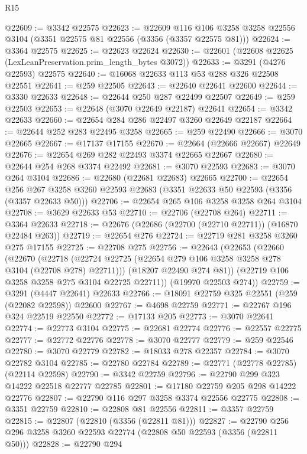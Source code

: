 \begin{lexlean}{R15}
\begin{coremodule}
@22609 := @3342 @22575
@22623 := @22609
    @116
    @106
    @3258
    @3258
    @22556
    @3104
    (@3351 @22575 @81 @22556 (@3356 (@3357 @22575 @81)))
@22624 := @3364 @22575
@22625 := @22623 @22624
@22630 := @22601 (@22608 @22625 (LexLeanPreservation.prim_length_bytes @3072))
@22633 := @3291 (@4276 @22593) @22575
@22640 := @16068 @22633 @113 @53 @288 @326 @22508 @22551
@22641 := @259 @22505
@22643 := @22640 @22641 @22600
@22644 := @3330 @22633
@22648 := @22644 @250 @287 @22499 @22507
@22649 := @259 @22503
@22653 := @22648 (@3070 @22649 @22187) @22641
@22654 := @3342 @22633
@22660 := @22654 @284 @286 @22497 @3260 @22649 @22187
@22664 := @22644 @252 @283 @22495 @3258
@22665 := @259 @22490
@22666 := @3070 @22665
@22667 := @17137 @17155
@22670 := @22664 (@22666 @22667) @22649
@22676 := @22654 @269 @282 @22493 @3374 @22665 @22667
@22680 := @22644 @254 @268 @3374 @22492
@22681 := @3070 @22593
@22683 := @3070 @264 @3104
@22686 := @22680 (@22681 @22683) @22665
@22700 := @22654
    @256
    @267
    @3258
    @3260
    @22593
    @22683
    (@3351 @22633 @50 @22593 (@3356 (@3357 @22633 @50)))
@22706 := @22654 @265 @106 @3258 @3258 @264 @3104
@22708 := @3629 @22633 @53
@22710 := @22706 (@22708 @264)
@22711 := @3364 @22633
@22718 := @22676 (@22686 (@22700 (@22710 @22711)) (@16870 @22484 @263))
@22719 := @22654 @276
@22724 := @22719 @281 @3258 @3260 @275 @17155
@22725 := @22708 @275
@22756 := @22643
    (@22653
      (@22660
        (@22670
          (@22718 (@22724 @22725 (@22654 @279 @106 @3258 @3258 @278 @3104 (@22708 @278) @22711)))
          (@18207 @22490 @274 @81))
        (@22719 @106 @3258 @3258 @275 @3104 @22725 @22711))
      (@19970 @22503 @274))
@22759 := @3291 (@4447 @22641) @22633
@22766 := @18091 @22759 @325 @22551 (@259 (@22082 @22598)) @22600
@22767 := @4698 @22759
@22771 := @22767 @196 @324 @22519 @22550
@22772 := @17133 @205
@22773 := @3070 @22641
@22774 := @22773 @3104
@22775 := @22681 @22774
@22776 := @22557 @22775
@22777 := @22772 @22776
@22778 := @3070 @22777
@22779 := @259 @22546
@22780 := @3070 @22779
@22782 := @18033 @278 @22357
@22784 := @3070 @22782 @3104
@22785 := @22780 @22784
@22789 := @22771 (@22778 @22785) (@22114 @22598)
@22790 := @3342 @22759
@22796 := @22790 @299 @323 @14222 @22518 @22777 @22785
@22801 := @17180 @22759 @205 @298 @14222 @22776
@22807 := @22790 @116 @297 @3258 @3374 @22556 @22775
@22808 := @3351 @22759
@22810 := @22808 @81 @22556
@22811 := @3357 @22759
@22815 := @22807 (@22810 (@3356 (@22811 @81)))
@22827 := @22790 @256 @296 @3258 @3260 @22593 @22774 (@22808 @50 @22593 (@3356 (@22811 @50)))
@22828 := @22790 @294

\end{coremodule}
\end{lexlean}
